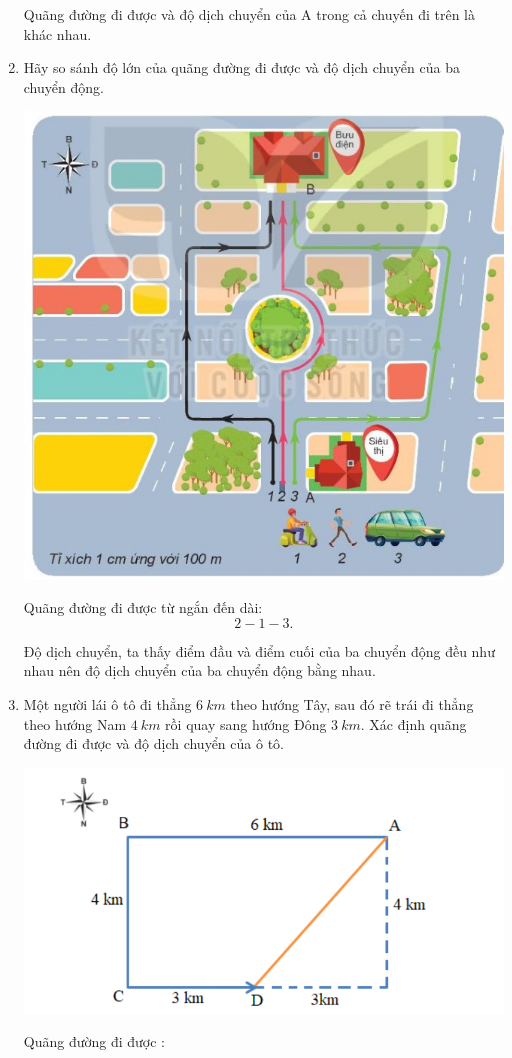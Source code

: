 \begin{enumerate}[label=\bfseries Bài \arabic*:]
{\begin{enumerate}[label=\alph*)]
			
			Quãng đường đi được và độ dịch chuyển của A trong cả chuyến đi trên là khác nhau. 
			
		\end{enumerate}
	}
	
	\item {}
	
	
	{
		Hãy so sánh độ lớn của quãng đường đi được và độ dịch chuyển của ba chuyển động. 
		
		\begin{center}
			\includegraphics[scale=0.8]{../figs/VN10-2022-PH-TP004-3.jpg}
		\end{center}
	}
	
	\hideall
	{	
		Quãng đường đi được từ ngắn đến dài: $$2 - 1 - 3.$$
		
		Độ dịch chuyển, ta thấy điểm đầu và điểm cuối của ba chuyển động đều như nhau nên độ dịch chuyển của ba chuyển động bằng nhau.
		
	}
	
	
	\item {}
	
	
	{
		Một người lái ô tô đi thẳng $\SI{6}{km}$ theo hướng Tây, sau đó rẽ trái đi thẳng theo hướng Nam $\SI{4}{km}$ rồi quay sang hướng Đông $\SI{3}{km}$. Xác định quãng đường đi được và độ dịch chuyển của ô tô.
	}
	
	\hideall
	{	\begin{center}
			\includegraphics[width=0.4\linewidth]{../figs/VN10-2022-PH-TP004-P-1}
		\end{center}
		Quãng đường đi được :
		
}
\end{enumerate}
